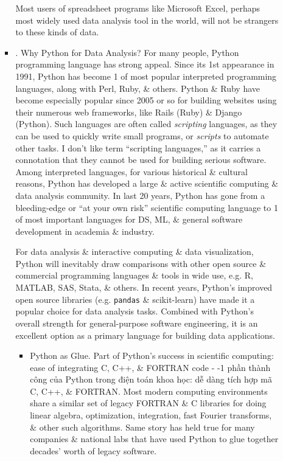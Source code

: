 \documentclass{article}
\begin{document}
\begin{enumerate}
\begin{itemize}
\begin{itemize}
			Most users of spreadsheet programs like Microsoft Excel, perhaps most widely used data analysis tool in the world, will not be strangers to these kinds of data.
			\item {. Why Python for Data Analysis?} For many people, Python programming language has strong appeal. Since its 1st appearance in 1991, Python has become 1 of most popular interpreted programming languages, along with Perl, Ruby, \& others. Python \& Ruby have become especially popular since 2005 or so for building websites using their numerous web frameworks, like Rails (Ruby) \& Django (Python). Such languages are often called {\it scripting} languages, as they can be used to quickly write small programs, or {\it scripts} to automate other tasks. I don't like term ``scripting languages,'' as it carries a connotation that they cannot be used for building serious software. Among interpreted languages, for various historical \& cultural reasons, Python has developed a large \& active scientific computing \& data analysis community. In last 20 years, Python has gone from a bleeding-edge or ``at your own risk'' scientific computing language to 1 of most important languages for DS, ML, \& general software development in academia \& industry.
			
			For data analysis \& interactive computing \& data visualization, Python will inevitably draw comparisons with other open source \& commercial programming languages \& tools in wide use, e.g. R, MATLAB, SAS, Stata, \& others. In recent years, Python's improved open source libraries (e.g. {\tt pandas} \& scikit-learn) have made it a popular choice for data analysis tasks. Combined with Python's overall strength for general-purpose software engineering, it is an excellent option as a primary language for building data applications.
			\begin{itemize}
				\item {\sf Python as Glue.} Part of Python's success in scientific computing: ease of integrating C, C++, \& FORTRAN code - -1 phần thành công của Python trong điện toán khoa học: dễ dàng tích hợp mã C, C++, \& FORTRAN. Most modern computing environments share a similar set of legacy FORTRAN \& C libraries for doing linear algebra, optimization, integration, fast Fourier transforms, \& other such algorithms. Same story has held true for many companies \& national labs that have used Python to glue together decades' worth of legacy software.
				

\end{itemize}
\end{itemize}
\end{itemize}
\end{enumerate}
\end{document}
